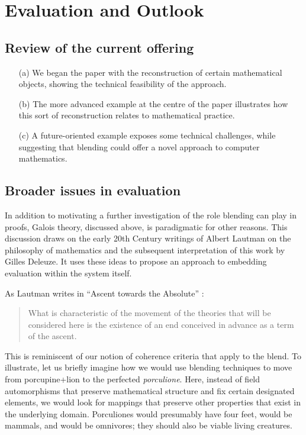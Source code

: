 \section{Evaluation and Outlook}
\label{sec:eval}

\subsection{Review of the current offering}

\begin{itemize}
\item[(a)] We began the paper with the reconstruction of certain
mathematical objects, showing the technical feasibility of the
approach. 
\item[(b)] The more advanced example at the centre of the paper
  illustrates how this sort of reconstruction relates to mathematical
  practice.
\item[(c)] A future-oriented example exposes some technical
  challenges, while suggesting that blending could offer a novel
  approach to computer mathematics.
\end{itemize}

\subsection{Broader issues in evaluation}

In addition to motivating a further investigation of the role blending
can play in proofs, Galois theory, discussed above, is paradigmatic
for other reasons.  This discussion draws on the early 20th Century
writings of Albert Lautman on the philosophy of mathematics and the
subsequent interpretation of this work by Gilles Deleuze.  It uses
these ideas to propose an approach to embedding evaluation within the
system itself.

As Lautman writes in ``Ascent towards the Absolute'' \cite[p. 126]{lautman2011mathematics}:
\begin{quote}
What is characteristic of the movement of the theories that will be
considered here is the existence of an end conceived in advance as a
term of the ascent.
\end{quote}

This is reminiscent of our notion of coherence criteria that apply to
the blend.  To illustrate, let us briefly imagine how we would use
blending techniques to move from porcupine+lion to the perfected
\emph{porculione}.  Here, instead of field automorphisms that preserve
mathematical structure and fix certain designated elements, we would
look for mappings that preserve other properties that exist in the
underlying domain.  Porculiones would presumably have four feet, would
be mammals, and would be omnivores; they should also be viable living
creatures.

